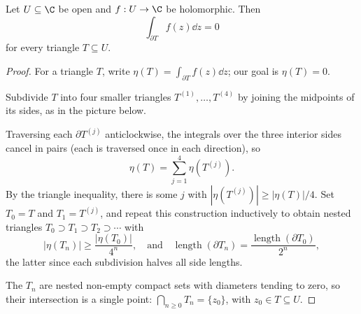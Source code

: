 \begin{theorem}
    Let $U \subseteq \C$ be open and $f: U \rightarrow \C$ be holomorphic. Then
    $$
    \int_{\partial T} f(z) \dd z = 0
    $$
    for every triangle $T \subseteq U$.
\end{theorem}
\begin{proof}
    For a triangle $T$, write $\eta(T) = \int_{\partial T} f(z) \dd z$; our goal is $\eta(T) = 0$.

    Subdivide $T$ into four smaller triangles $T^{(1)}, \dots, T^{(4)}$ by joining the midpoints of its sides, as in the picture below.

    \begin{center}
    \end{center}

    Traversing each $\partial T^{(j)}$ anticlockwise, the integrals over the three interior sides cancel in pairs (each is traversed once in each direction), so
    $$
    \eta(T) = \sum_{j = 1}^4 \eta(T^{(j)}).
    $$
    By the triangle inequality, there is some $j$ with $|\eta(T^{(j)})| \geq |\eta(T)|/4$. Set $T_0 = T$ and $T_1 = T^{(j)}$, and repeat this construction inductively to obtain nested triangles $T_0 \supset T_1 \supset T_2 \supset \cdots$ with
    $$
    |\eta(T_n)| \geq \frac{|\eta(T_0)|}{4^n}, \quad \text{and} \quad \operatorname{length}(\partial T_n) = \frac{\operatorname{length}(\partial T_0)}{2^n},
    $$
    the latter since each subdivision halves all side lengths.

    The $T_n$ are nested non-empty compact sets with diameters tending to zero, so their intersection is a single point: $\bigcap_{n \geq 0} T_n = \{z_0\}$, with $z_0 \in T \subseteq U$.


\end{proof}
